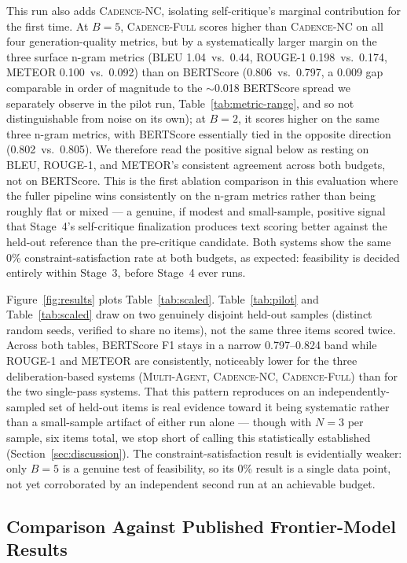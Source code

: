 \documentclass[preprint,12pt,authoryear]{elsarticle}
\newcommand{\sysMA}{\textsc{Multi-Agent}}
\newcommand{\sysNC}{\textsc{Cadence-NC}}
\newcommand{\sysFull}{\textsc{Cadence-Full}}
\renewcommand{\_}{\textunderscore\allowbreak{}}
\begin{document}
This run also adds \sysNC{}, isolating self-critique's marginal contribution for the first time. At $B=5$, \sysFull{} scores higher than \sysNC{} on all four generation-quality metrics, but by a systematically larger margin on the three surface n-gram metrics (BLEU 1.04~vs.~0.44, ROUGE-1 0.198~vs.~0.174, METEOR 0.100~vs.~0.092) than on BERTScore (0.806~vs.~0.797, a 0.009 gap comparable in order of magnitude to the $\sim$0.018 BERTScore spread we separately observe in the pilot run, Table~\ref{tab:metric-range}, and so not distinguishable from noise on its own); at $B=2$, it scores higher on the same three n-gram metrics, with BERTScore essentially tied in the opposite direction (0.802~vs.~0.805). We therefore read the positive signal below as resting on BLEU, ROUGE-1, and METEOR's consistent agreement across both budgets, not on BERTScore. This is the first ablation comparison in this evaluation where the fuller pipeline wins consistently on the n-gram metrics rather than being roughly flat or mixed --- a genuine, if modest and small-sample, positive signal that Stage~4's self-critique finalization produces text scoring better against the held-out reference than the pre-critique candidate. Both systems show the same 0\% constraint-satisfaction rate at both budgets, as expected: feasibility is decided entirely within Stage~3, before Stage~4 ever runs.

Figure~\ref{fig:results} plots Table~\ref{tab:scaled}. Table~\ref{tab:pilot} and Table~\ref{tab:scaled} draw on two genuinely disjoint held-out samples (distinct random seeds, verified to share no items), not the same three items scored twice. Across both tables, BERTScore F1 stays in a narrow 0.797--0.824 band while ROUGE-1 and METEOR are consistently, noticeably lower for the three deliberation-based systems (\sysMA{}, \sysNC{}, \sysFull{}) than for the two single-pass systems. That this pattern reproduces on an independently-sampled set of held-out items is real evidence toward it being systematic rather than a small-sample artifact of either run alone --- though with $N=3$ per sample, six items total, we stop short of calling this statistically established (Section~\ref{sec:discussion}). The constraint-satisfaction result is evidentially weaker: only $B=5$ is a genuine test of feasibility, so its 0\% result is a single data point, not yet corroborated by an independent second run at an achievable budget.

\subsection{Comparison Against Published Frontier-Model Results}
\label{sec:published-comparison}
\end{document}
